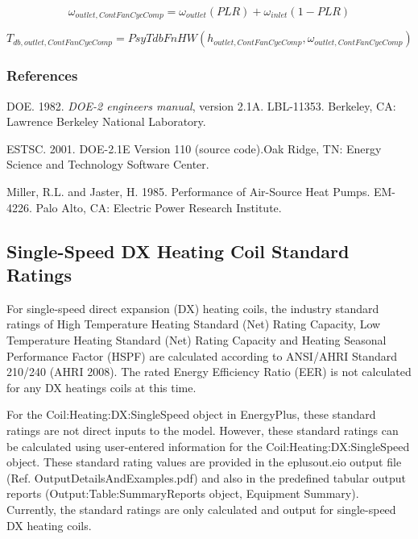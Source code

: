 \begin{equation}
{\omega_{outlet,ContFanCycComp}} = {\omega_{outlet}}\left( {PLR} \right) + {\omega_{inlet}}\left( {1 - PLR} \right)
\end{equation}

\begin{equation}
{T_{db,outlet,ContFanCycComp}} = PsyTdbFnHW({h_{outlet,ContFanCycComp}},{\omega_{outlet,ContFanCycComp}})
\end{equation}

\subsubsection{References}\label{references-5-001}

DOE. 1982. \emph{DOE-2 engineers manual}, version 2.1A. LBL-11353. Berkeley, CA: Lawrence Berkeley National Laboratory.

ESTSC. 2001. DOE-2.1E Version 110 (source code).Oak Ridge, TN: Energy Science and Technology Software Center.

Miller, R.L. and Jaster, H. 1985. Performance of Air-Source Heat Pumps. EM-4226. Palo Alto, CA: Electric Power Research Institute.

\subsection{Single-Speed DX Heating Coil Standard Ratings}\label{single-speed-dx-heating-coil-standard-ratings}

For single-speed direct expansion (DX) heating coils, the industry standard ratings of High Temperature Heating Standard (Net) Rating Capacity, Low Temperature Heating Standard (Net) Rating Capacity and Heating Seasonal Performance Factor (HSPF) are calculated according to ANSI/AHRI Standard 210/240 (AHRI 2008). The rated Energy Efficiency Ratio (EER) is not calculated for any DX heatings coils at this time.

For the Coil:Heating:DX:SingleSpeed object in EnergyPlus, these standard ratings are not direct inputs to the model. However, these standard ratings can be calculated using user-entered information for the Coil:Heating:DX:SingleSpeed object. These standard rating values are provided in the eplusout.eio output file (Ref. OutputDetailsAndExamples.pdf) and also in the predefined tabular output reports (Output:Table:SummaryReports object, Equipment Summary). Currently, the standard ratings are only calculated and output for single-speed DX heating coils.

